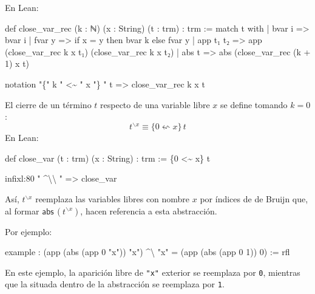 \documentclass[
  spanish,
  letterpaper,
  DIV=11,
  numbers=noendperiod]{scrreprt}
\newenvironment{Shaded}{\begin{snugshade}}{\end{snugshade}}
\newcommand{\KeywordTok}[1]{\textcolor[rgb]{0.00,0.23,0.31}{\textbf{#1}}}
\newcommand{\NormalTok}[1]{\textcolor[rgb]{0.00,0.23,0.31}{#1}}
\newcommand{\StringTok}[1]{\textcolor[rgb]{0.13,0.47,0.30}{#1}}
\renewcommand{\NormalTok}[1]{\textcolor[HTML]{000000}{#1}}
\renewcommand{\KeywordTok}[1]{\textcolor[HTML]{0000FF}{#1}}
\renewcommand{\StringTok}[1]{\textcolor[HTML]{A52A2A}{#1}}
\let\oldgreater\textgreater
\renewcommand{\textgreater}{\null\oldgreater}%
\theoremstyle{remark}
\begin{document}
En Lean:

\begin{Shaded}
\begin{Highlighting}[]
\KeywordTok{def}\NormalTok{ close\_var\_rec (k : ℕ) (x : String) (t : trm) : trm :=}
  \KeywordTok{match}\NormalTok{ t }\KeywordTok{with}
\NormalTok{  | bvar i    =\textgreater{} bvar i}
\NormalTok{  | fvar y    =\textgreater{} if x = y then bvar k else fvar y}
\NormalTok{  | app t₁ t₂ =\textgreater{} app (close\_var\_rec k x t₁) (close\_var\_rec k x t₂)}
\NormalTok{  | abs t     =\textgreater{} abs (close\_var\_rec (k + 1) x t)}

\KeywordTok{notation} \StringTok{"\{"}\NormalTok{ k }\StringTok{" \textless{}\textasciitilde{} "}\NormalTok{ x }\StringTok{"\} "}\NormalTok{ t =\textgreater{} close\_var\_rec k x t}
\end{Highlighting}
\end{Shaded}

El cierre de un término \(t\) respecto de una variable libre \(x\) se
define tomando \(k=0\): \[
t^{\backslash x} \equiv \{0 \leftsquigarrow x \} \, t
\] En Lean:

\begin{Shaded}
\begin{Highlighting}[]
\KeywordTok{def}\NormalTok{ close\_var (t : trm) (x : String) : trm :=}
\NormalTok{  \{0 \textless{}\textasciitilde{} x\} t}

\NormalTok{infixl:80 }\StringTok{" \^{}\textbackslash{}\textbackslash{} "}\NormalTok{ =\textgreater{} close\_var}
\end{Highlighting}
\end{Shaded}

Así, \(t^{\backslash x}\) reemplaza las variables libres con nombre
\(x\) por índices de de Bruijn que, al formar
\(\mathsf{abs} \, (t^{\backslash x})\), hacen referencia a esta
abstracción.

Por ejemplo:

\begin{Shaded}
\begin{Highlighting}[]
\KeywordTok{example}\NormalTok{ :}
\NormalTok{  (app (abs (app 0 }\StringTok{"x"}\NormalTok{)) }\StringTok{"x"}\NormalTok{) \^{}\textbackslash{} }\StringTok{"x"}\NormalTok{ = (app (abs (app 0 1)) 0) := }\KeywordTok{rfl}
\end{Highlighting}
\end{Shaded}

En este ejemplo, la aparición libre de \texttt{"x"} exterior se
reemplaza por \texttt{0}, mientras que la situada dentro de la
abstracción se reemplaza por \texttt{1}.
\end{document}
